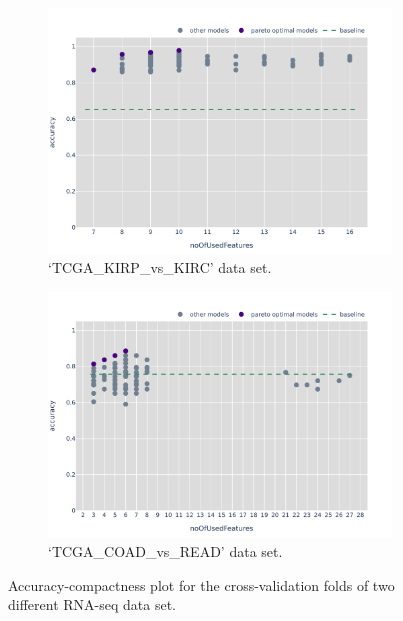 \begin{figure}
        \centering
        \begin{subfigure}{\textwidth}
                \centering
                \includegraphics[width=0.85\columnwidth]{figures/genes/paretoFront_TCGA_KIRP_vs_KIRC.pdf}
                \caption{`TCGA\_KIRP\_vs\_KIRC' data set.}\label{fig:paretoKIRPvsKIRC}
        \end{subfigure}
        \hfill
        \begin{subfigure}{\textwidth}
                \centering
                \includegraphics[width=0.85\columnwidth]{figures/genes/paretoFront_TCGA_COAD_vs_READ.pdf}
                \caption{`TCGA\_COAD\_vs\_READ' data set.}\label{fig:paretoCOADvsREAD}
        \end{subfigure}
        \caption{Accuracy-compactness plot for the cross-validation folds of two different RNA-seq data set.}\label{fig:genePareto}
\end{figure}

